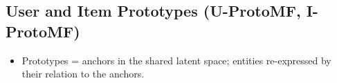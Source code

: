 \subsection{User and Item Prototypes (U-ProtoMF, I-ProtoMF)}
\label{sec:bg-protomf-ui}
\begin{itemize}
    \item Prototypes = anchors in the shared latent space; entities re-expressed by their relation to the anchors. 

\end{itemize}
